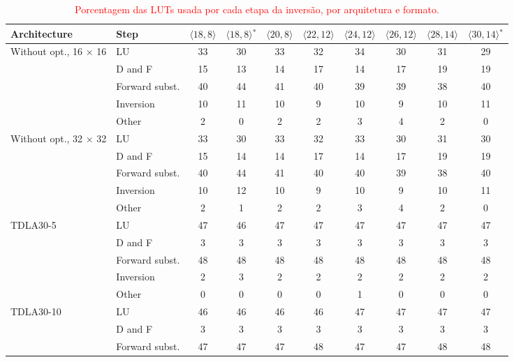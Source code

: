 \begin{table}[htbp]
\caption{\textcolor{red}{Porcentagem das LUTs usada por cada etapa da inversão, por arquitetura e formato.}}
\label{tab:etapas-lut}
\vspace{4pt} %
\centering
\scriptsize
\color{red}
\renewcommand{\arraystretch}{1.05}
\setlength{\tabcolsep}{3pt}
\begin{tabular}{llcccccccc}
\toprule
\textbf{Architecture} & \textbf{Step} & \textbf{$\langle 18,8\rangle$} & \textbf{$\langle 18,8\rangle$$^{*}$} & \textbf{$\langle 20,8\rangle$} & \textbf{$\langle 22,12\rangle$} & \textbf{$\langle 24,12\rangle$} & \textbf{$\langle 26,12\rangle$} & \textbf{$\langle 28,14\rangle$} & \textbf{$\langle 30,14\rangle$$^{*}$} \\
\midrule
\multirow{5}{*}{Without opt., 16 $\times$ 16} & LU & 33 & 30 & 33 & 32 & 34 & 30 & 31 & 29 \\
 & D and F & 15 & 13 & 14 & 17 & 14 & 17 & 19 & 19 \\
 & Forward subst. & 40 & 44 & 41 & 40 & 39 & 39 & 38 & 40 \\
 & Inversion & 10 & 11 & 10 & 9 & 10 & 9 & 10 & 11 \\
 & Other & 2 & 0 & 2 & 2 & 3 & 4 & 2 & 0 \\
\midrule
\multirow{5}{*}{Without opt., 32 $\times$ 32} & LU & 33 & 30 & 33 & 32 & 33 & 30 & 31 & 30 \\
 & D and F & 15 & 14 & 14 & 17 & 14 & 17 & 19 & 19 \\
 & Forward subst. & 40 & 44 & 41 & 40 & 40 & 39 & 38 & 40 \\
 & Inversion & 10 & 12 & 10 & 9 & 10 & 9 & 10 & 11 \\
 & Other & 2 & 1 & 2 & 2 & 3 & 4 & 2 & 0 \\
\midrule
\multirow{5}{*}{TDLA30-5} & LU & 47 & 46 & 47 & 47 & 47 & 47 & 47 & 47 \\
 & D and F & 3 & 3 & 3 & 3 & 3 & 3 & 3 & 3 \\
 & Forward subst. & 48 & 48 & 48 & 48 & 48 & 48 & 48 & 48 \\
 & Inversion & 2 & 3 & 2 & 2 & 2 & 2 & 2 & 2 \\
 & Other & 0 & 0 & 0 & 0 & 1 & 0 & 0 & 0 \\
\midrule
\multirow{5}{*}{TDLA30-10} & LU & 46 & 46 & 46 & 46 & 47 & 47 & 47 & 47 \\
 & D and F & 3 & 3 & 3 & 3 & 3 & 3 & 3 & 3 \\
 & Forward subst. & 47 & 47 & 47 & 48 & 47 & 47 & 48 & 48 \\

\end{tabular}
\end{table}
